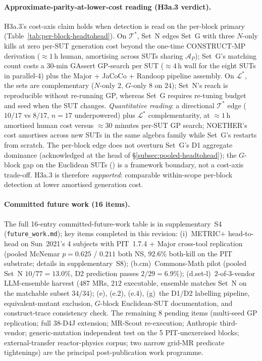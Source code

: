 \documentclass[acmsmall, screen]{acmart}
\begin{document}
\paragraph{Approximate-parity-at-lower-cost reading (H3a.3 verdict).}
\label{para:cost-axis-h3a}
H3a.3's cost-axis claim holds when detection is read on the per-block primary (Table~\ref{tab:per-block-headtohead}). On $\mathcal{T}^{*}$, Set~N edges Set~G with three $N$-only kills at zero per-SUT generation cost beyond the one-time CONSTRUCT-MP derivation ($\approx 1$\,h human, amortising across SUTs sharing $\mathcal{A}_P$); Set~G's matching count costs a 30-min GAssert GP-search per SUT ($\approx 4$\,h wall for the eight SUTs in parallel-4) plus the Major + JaCoCo + Randoop pipeline assembly. On $\mathcal{L}^{*}$, the sets are complementary ($N$-only $2$, $G$-only $8$ on $24$); Set~N's reach is reproducible without re-running GP, whereas Set~G requires re-tuning budget and seed when the SUT changes. \emph{Quantitative reading}: a directional $\mathcal{T}^{*}$ edge ($10/17$ vs $8/17$, $n=17$ underpowered) plus $\mathcal{L}^{*}$ complementarity, at $\approx 1$\,h amortised human cost versus $\approx 30$ minutes per-SUT GP search; NOETHER's cost amortises across new SUTs in the same algebra family while Set~G's restarts from scratch. The per-block edge does not overturn Set~G's D1 aggregate dominance (acknowledged at the head of \S\ref{subsec:pooled-headtohead}); the $G$-block gap on the Euclidean SUTs () is a framework boundary, not a cost-axis trade-off. H3a.3 is therefore \emph{supported}: comparable within-scope per-block detection at lower amortised generation cost.

\paragraph{Committed future work (16 items).}
\label{para:future-work}
The full 16-entry committed-future-work table is in supplementary~S4 (\texttt{future\_work.md}); key items completed in this revision: (i)~METRIC$+$ head-to-head on Sun~2021's 4 subjects with PIT~1.7.4 + Major cross-tool replication (pooled McNemar $p = 0.625$ / $0.211$ both NS, $92.6\%$ both-kill on the PIT substrate; details in supplementary~S8); (b.cm)~Commons-Math pilot (pooled Set~N $10/77 = 13.0\%$, D2 prediction passes $2/29 = 6.9\%$); (d.set-l)~$2$-of-$3$-vendor LLM-ensemble harvest ($487$ MRs, $212$ executable, ensemble matches Set~N on the matchable subset $34/34$); (e), (e.2), (e.4), (g)~the D1/D2 labelling pipeline, equivalent-mutant exclusion, $G$-block Euclidean-SUT documentation, and construct-trace consistency check. The remaining 8 pending items (multi-seed GP replication; full $38$-D4J extension; MR-Scout re-execution; Anthropic third-vendor; generic-mutation independent test on the 5 PIT-unexercised blocks; external-transfer reactor-physics corpus; two narrow grid-MR predicate tightenings) are the principal post-publication work programme.
\end{document}
